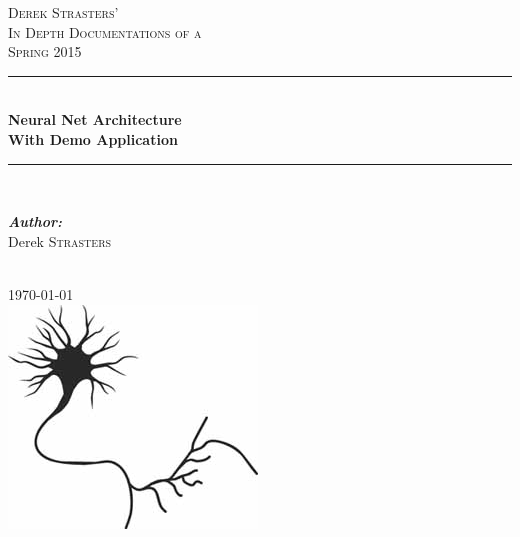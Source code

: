 \documentclass[a4paper,10pt]{article}
\let\oldemph\emph
\renewcommand{\emph}[1]{\textbf{\oldemph{#1}}}
\begin{document}

\begin{titlepage}

\newcommand{\HRule}{\rule{\linewidth}{0.5mm}} %

\center

\textsc{\LARGE Derek Strasters'}\\[1.5cm]
\textsc{\Large In Depth Documentations of a}\\[0.5cm]
\textsc{\large Spring 2015}\\[0.5cm]

\HRule \\[0.4cm]
{ \huge \bfseries Neural Net Architecture}\\[0.4cm]
{ \huge \bfseries With Demo Application}\\[0.1cm]
\HRule \\[1.cm]

\begin{minipage}{\textwidth}
\begin{flushleft} \large
\emph{Author:}\\  
Derek \textsc{Strasters}
\end{flushleft}
\end{minipage}
\\[3cm]

{\large \today}\\[4.0cm]

\includegraphics[scale=00.55]{images/neuron.jpg}\\

\vfill

\end{titlepage} 

\end{document}
